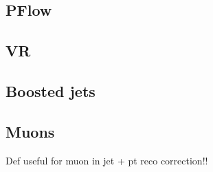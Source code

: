 \subsection{PFlow}

\subsection{VR}

\subsection{Boosted jets}

\subsection{Muons}
Def useful for muon in jet + pt reco correction!!


